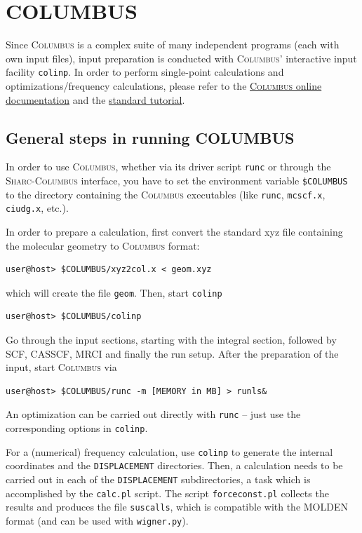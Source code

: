\documentclass[a4paper,11pt,DIV=15,openany]{scrbook}
\newcommand{\sharc}{\textsc{Sharc}}
\newcommand{\ttt}[1]{\texttt{#1}}
\begin{document}
\section{COLUMBUS}

Since \textsc{Columbus} is a complex suite of many independent programs (each with own input files), input preparation is conducted with \textsc{Columbus}' interactive input facility \ttt{colinp}. In order to perform single-point calculations and optimizations/frequency calculations, please refer to the 
\href{http://www.univie.ac.at/columbus/docs_COL70/documentation_main.html}{\textsc{Columbus} online documentation} and the 
\href{http://www.univie.ac.at/columbus/docs_COL70/tutorial.pdf}{standard tutorial}.

\subsection{General steps in running COLUMBUS}

In order to use \textsc{Columbus}, whether via its driver script \ttt{runc} or through the \sharc-\textsc{Columbus} interface, you have to set the environment variable \ttt{\$COLUMBUS} to the directory containing the \textsc{Columbus} executables (like \ttt{runc}, \ttt{mcscf.x}, \ttt{ciudg.x}, etc.).

In order to prepare a calculation, first convert the standard xyz file containing the molecular geometry to \textsc{Columbus} format:
\begin{verbatim}
user@host> $COLUMBUS/xyz2col.x < geom.xyz
\end{verbatim}
which will create the file \ttt{geom}. Then, start \ttt{colinp}
\begin{verbatim}
user@host> $COLUMBUS/colinp
\end{verbatim}

Go through the input sections, starting with the integral section, followed by SCF, CASSCF, MRCI and finally the run setup. After the preparation of the input, start \textsc{Columbus} via
\begin{verbatim}
user@host> $COLUMBUS/runc -m [MEMORY in MB] > runls&
\end{verbatim}
An optimization can be carried out directly with \ttt{runc} -- just use the corresponding options in \ttt{colinp}.

For a (numerical) frequency calculation, use \ttt{colinp} to generate the internal coordinates and the \ttt{DISPLACEMENT} directories. Then, a calculation needs to be carried out in each of the \ttt{DISPLACEMENT} subdirectories, a task which is accomplished by the \ttt{calc.pl} script. The script \ttt{forceconst.pl} collects the results and produces the file \ttt{suscalls}, which is compatible with the MOLDEN format (and can be used with \ttt{wigner.py}).
\end{document}
